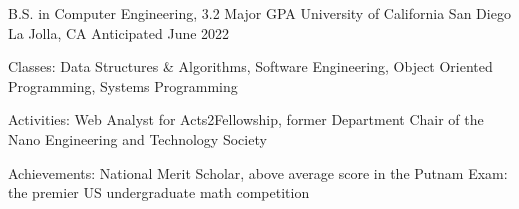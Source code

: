 \begin{cventries}
  \cventry
    {B.S. in Computer Engineering, 3.2 Major GPA}
    {University of California San Diego}
    {La Jolla, CA}
    {Anticipated June 2022}
    {
      \begin{cvitems}
        \item {Classes: Data Structures \& Algorithms, Software Engineering, Object Oriented Programming, Systems Programming}
        \item {Activities: Web Analyst for Acts2Fellowship, former Department Chair of the Nano Engineering and Technology Society}
        \item {Achievements: National Merit Scholar, above average score in the Putnam Exam: the premier US undergraduate math competition}
      \end{cvitems}
    }
\end{cventries}
